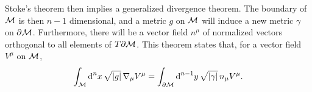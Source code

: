 Stoke's theorem then implies a generalized divergence theorem.
The boundary of $\mathcal{M}$ is then $n-1$ dimensional, and a metric $g$ on $\mathcal{M}$ will induce a new metric $\gamma$ on $\partial \mathcal{M}$.
Furthermore, there will be a vector field $n^\mu$ of normalized vectors orthogonal to all elements of $T \partial \mathcal{M}$.
This theorem states that, for a vector field $V^\mu$ on $\mathcal{M}$,
%
\begin{equation}
    \int_{\mathcal{M}} \text{d}^n x \, \sqrt{|g|} \,  \nabla_\mu V^\mu 
    = \int_{\partial \mathcal{M}} \text{d}^{n-1}y \, \sqrt{|\gamma|} \, n_\mu V^\mu.
\end{equation}
